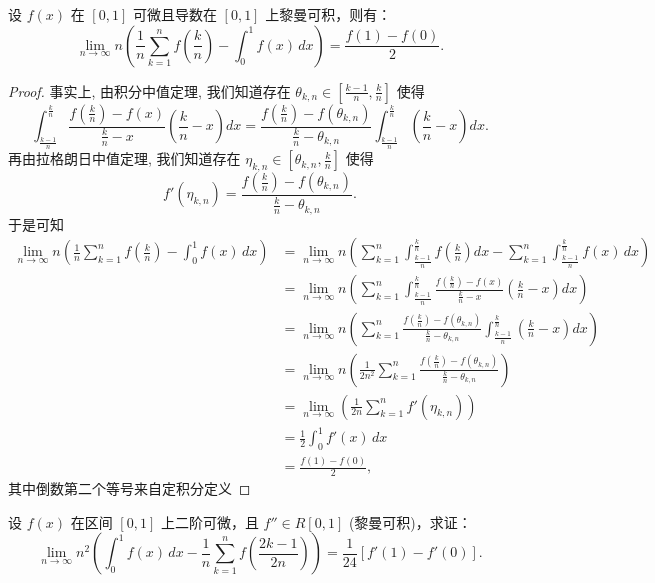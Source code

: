 \documentclass[lang=cn,10pt,thmcnt=section]{elegantbook}
\begin{document}
	\begin{example}
	设 \( f(x) \) 在 \([0,1]\) 可微且导数在 \([0,1]\) 上黎曼可积，则有：
	\[
	\lim_{n \to \infty} n \left( \frac{1}{n} \sum_{k=1}^n f\left(\frac{k}{n}\right) - \int_0^1 f(x) \, dx \right) = \frac{f(1) - f(0)}{2}.
	\]
	\end{example}
	\begin{proof}
	事实上, 由积分中值定理, 我们知道存在 $\theta_{k,n} \in [\frac{k-1}{n}, \frac{k}{n}]$ 使得
	\[
	\int_{\frac{k-1}{n}}^{\frac{k}{n}} \frac{f(\frac{k}{n}) - f(x)}{\frac{k}{n} - x} \left(\frac{k}{n} - x\right) dx = \frac{f(\frac{k}{n}) - f(\theta_{k,n})}{\frac{k}{n} - \theta_{k,n}} \int_{\frac{k-1}{n}}^{\frac{k}{n}} \left(\frac{k}{n} - x\right) dx.
	\]
	再由拉格朗日中值定理, 我们知道存在 $\eta_{k,n} \in [\theta_{k,n}, \frac{k}{n}]$ 使得
	\[
	f'(\eta_{k,n}) = \frac{f(\frac{k}{n}) - f(\theta_{k,n})}{\frac{k}{n} - \theta_{k,n}}.
	\]
	于是可知
	\begin{align*}
	\lim_{n\to\infty} n \left( \frac{1}{n} \sum_{k=1}^n f\left(\frac{k}{n}\right) - \int_0^1 f(x) \, dx \right) &= \lim_{n\to\infty} n \left( \sum_{k=1}^n \int_{\frac{k-1}{n}}^{\frac{k}{n}} f\left(\frac{k}{n}\right) dx - \sum_{k=1}^n \int_{\frac{k-1}{n}}^{\frac{k}{n}} f(x) \, dx \right) \\
	&= \lim_{n\to\infty} n \left( \sum_{k=1}^n \int_{\frac{k-1}{n}}^{\frac{k}{n}} \frac{f(\frac{k}{n}) - f(x)}{\frac{k}{n} - x} \left(\frac{k}{n} - x\right) dx \right) \\
	&= \lim_{n\to\infty} n \left( \sum_{k=1}^n \frac{f(\frac{k}{n}) - f(\theta_{k,n})}{\frac{k}{n} - \theta_{k,n}} \int_{\frac{k-1}{n}}^{\frac{k}{n}} \left(\frac{k}{n} - x\right) dx \right) \\
	&= \lim_{n\to\infty} n \left( \frac{1}{2n^2} \sum_{k=1}^n \frac{f(\frac{k}{n}) - f(\theta_{k,n})}{\frac{k}{n} - \theta_{k,n}} \right) \\
	&= \lim_{n\to\infty} \left( \frac{1}{2n} \sum_{k=1}^n f'(\eta_{k,n}) \right) \\
	&= \frac{1}{2} \int_0^1 f'(x) \, dx \\
	&= \frac{f(1)-f(0)}{2},
	\end{align*}
	其中倒数第二个等号来自定积分定义
	\end{proof}
\begin{example}
    设 \( f(x) \) 在区间 \([0,1]\) 上二阶可微，且 \( f'' \in R[0,1] \) (黎曼可积)，求证：
\[
\lim_{n \to \infty} n^2 \left( \int_0^1 f(x) \, dx - \frac{1}{n} \sum_{k=1}^n f\left(\frac{2k-1}{2n}\right) \right) = \frac{1}{24} [f'(1) - f'(0)].
\]
\end{example}
\end{document}
